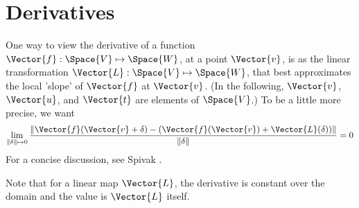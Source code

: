 
\section{Derivatives}
\label{sec:Derivatives}

One way to view the derivative of a function
$\Vector{f}:\Space{V} \mapsto \Space{W}$,
at a point $\Vector{v}$,
is as the linear transformation $\Vector{L}:\Space{V} \mapsto \Space{W}$,
that best approximates the local 'slope' of $\Vector{f}$ at $\Vector{v}$.
(In the following, $\Vector{v}$, $\Vector{u}$, and $\Vector{t}$ are elements of $\Space{V}$.)
To be a little more precise, we want
\begin{equation}
\lim_{ \|{\bf \delta}  \| \mapsto 0}
\frac{ \| \Vector{f}(\Vector{v} + {\bf \delta}) - (\Vector{f}(\Vector{v}) + \Vector{L}({\bf\delta})) \|}
{\|{\bf \delta}  \| }
 = 0
\end{equation}
For a concise discussion, see Spivak \cite{Spivak:1965:CalculusOnManifolds}.

Note that for a linear map $\Vector{L}$,
the derivative is constant over the domain
and the value is $\Vector{L}$ itself.


